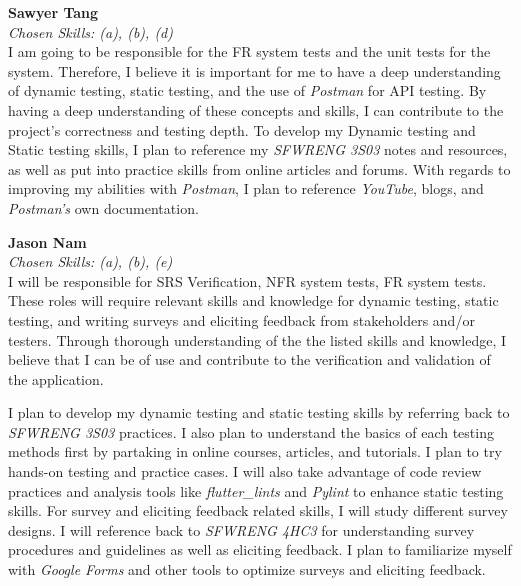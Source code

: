 \documentclass[12pt, titlepage]{article}
\begin{document}
\begin{enumerate}
  \medskip
  \textbf{Sawyer Tang}\\
  \textit{Chosen Skills: (a), (b), (d)} \\
  I am going to be responsible for the FR system tests and the unit tests for the system. Therefore, I believe it is important for me to have a deep understanding of dynamic testing, static testing, and the use of \textit{Postman} for API testing. By having a deep understanding of these concepts and skills, I can contribute to the project's correctness and testing depth.
  To develop my Dynamic testing and Static testing skills, I plan to reference my \textit{SFWRENG 3S03} notes and resources, as well as put into practice skills from online articles and forums. With regards to improving my abilities with \textit{Postman}, I plan to reference \textit{YouTube}, blogs, and \textit{Postman's} own documentation.

  \medskip
  \textbf{Jason Nam}\\
  \textit{Chosen Skills: (a), (b), (e)}\\
  I will be responsible for SRS Verification, NFR system tests, FR system tests. These roles will require relevant skills and knowledge for dynamic testing, static testing, and writing surveys and eliciting feedback from stakeholders and/or testers. Through thorough understanding of the the listed skills and knowledge, I believe that I can be of use and contribute to the verification and validation of the application.\par
  I plan to develop my dynamic testing and static testing skills by referring back to \textit{SFWRENG 3S03} practices. I also plan to understand the basics of each testing methods first by partaking in online courses, articles, and tutorials. I plan to try hands-on testing and practice cases. I will also take advantage of code review practices and analysis tools like \textit{flutter\_lints} and \textit{Pylint} to enhance static testing skills. For survey and eliciting feedback related skills, I will study different survey designs. I will reference back to \textit{SFWRENG 4HC3} for understanding survey procedures and guidelines as well as eliciting feedback. I plan to familiarize myself with \textit{Google Forms} and other tools to optimize surveys and eliciting feedback.


\end{enumerate}
\end{document}
